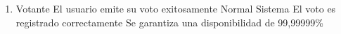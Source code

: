 \begin{enumerate}



\medskip
\item {}
{Votante}
{El usuario emite su voto exitosamente}
{Normal}
{Sistema}
{El voto es registrado correctamente}
{Se garantiza una disponibilidad de 99,99999\%}
\end{enumerate}
